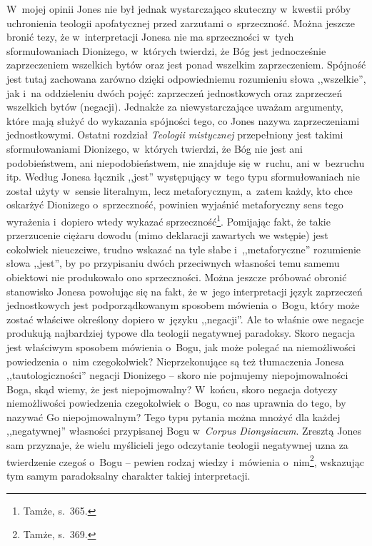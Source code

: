 W~mojej opinii Jones nie był jednak wystarczająco skuteczny w~kwestii próby uchronienia teologii apofatycznej przed zarzutami o~sprzeczność. Można jeszcze bronić tezy, że w~interpretacji Jonesa nie ma sprzeczności w~tych sformułowaniach Dionizego, w~których twierdzi, że Bóg jest jednocześnie zaprzeczeniem wszelkich bytów oraz jest ponad wszelkim zaprzeczeniem. Spójność jest tutaj zachowana zarówno dzięki odpowiedniemu rozumieniu słowa ,,wszelkie'', jak i~na oddzieleniu dwóch pojęć: zaprzeczeń jednostkowych oraz zaprzeczeń wszelkich bytów (negacji). Jednakże za niewystarczające uważam argumenty, które mają służyć do wykazania spójności tego, co Jones nazywa zaprzeczeniami jednostkowymi. Ostatni rozdział \textit{Teologii mistycznej} przepełniony jest takimi sformułowaniami Dionizego, w~których twierdzi, że Bóg nie jest ani podobieństwem, ani niepodobieństwem, nie znajduje się w~ruchu, ani w~bezruchu itp. Według Jonesa łącznik ,,jest'' występujący w~tego typu sformułowaniach nie został użyty w~sensie literalnym, lecz metaforycznym, a~zatem każdy, kto chce oskarżyć Dionizego o~sprzeczność, powinien wyjaśnić metaforyczny sens tego wyrażenia i~dopiero wtedy wykazać sprzeczność\footnote{Tamże, s.~365.}. Pomijając fakt, że takie przerzucenie ciężaru dowodu (mimo deklaracji zawartych we wstępie) jest cokolwiek nieuczciwe, trudno wskazać na tyle słabe i~,,metaforyczne'' rozumienie słowa ,,jest'', by po przypisaniu dwóch przeciwnych własności temu samemu obiektowi nie produkowało ono sprzeczności. Można jeszcze próbować obronić stanowisko Jonesa powołując się na fakt, że w~jego interpretacji język zaprzeczeń jednostkowych jest podporządkowanym sposobem mówienia o~Bogu, który może zostać właściwe określony dopiero w~języku ,,negacji''. Ale to właśnie owe negacje produkują najbardziej typowe dla teologii negatywnej paradoksy. Skoro negacja jest właściwym sposobem mówienia o~Bogu, jak może polegać na niemożliwości powiedzenia o~nim czegokolwiek? Nieprzekonujące są też tłumaczenia Jonesa ,,tautologiczności'' negacji Dionizego -- skoro nie pojmujemy niepojmowalności Boga, skąd wiemy, że jest niepojmowalny? W~końcu, skoro negacja dotyczy niemożliwości powiedzenia czegokolwiek o~Bogu, co nas uprawnia do tego, by nazywać Go niepojmowalnym? Tego typu pytania można mnożyć dla każdej ,,negatywnej'' własności przypisanej Bogu w~\textit{Corpus Dionysiacum}. Zresztą Jones sam przyznaje, że wielu myślicieli jego odczytanie teologii negatywnej uzna za twierdzenie czegoś o~Bogu -- pewien rodzaj wiedzy i~mówienia o~nim\footnote{Tamże, s.~369.}, wskazując tym samym paradoksalny charakter takiej interpretacji.

